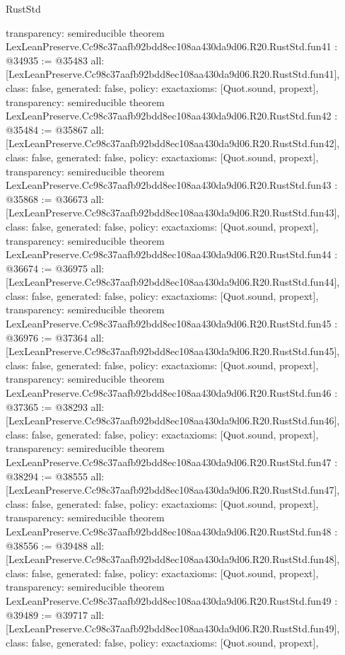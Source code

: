 \begin{lexlean}{RustStd}
\begin{coremodule}
{  transparency: semireducible
}
theorem LexLeanPreserve.Cc98c37aafb92bdd8ec108aa430da9d06.R20.RustStd.fun41 : @34935 := @35483 {
  all: [LexLeanPreserve.Cc98c37aafb92bdd8ec108aa430da9d06.R20.RustStd.fun41],
  class: false,
  generated: false,
  policy: exact{axioms: [Quot.sound, propext]},
  transparency: semireducible
}
theorem LexLeanPreserve.Cc98c37aafb92bdd8ec108aa430da9d06.R20.RustStd.fun42 : @35484 := @35867 {
  all: [LexLeanPreserve.Cc98c37aafb92bdd8ec108aa430da9d06.R20.RustStd.fun42],
  class: false,
  generated: false,
  policy: exact{axioms: [Quot.sound, propext]},
  transparency: semireducible
}
theorem LexLeanPreserve.Cc98c37aafb92bdd8ec108aa430da9d06.R20.RustStd.fun43 : @35868 := @36673 {
  all: [LexLeanPreserve.Cc98c37aafb92bdd8ec108aa430da9d06.R20.RustStd.fun43],
  class: false,
  generated: false,
  policy: exact{axioms: [Quot.sound, propext]},
  transparency: semireducible
}
theorem LexLeanPreserve.Cc98c37aafb92bdd8ec108aa430da9d06.R20.RustStd.fun44 : @36674 := @36975 {
  all: [LexLeanPreserve.Cc98c37aafb92bdd8ec108aa430da9d06.R20.RustStd.fun44],
  class: false,
  generated: false,
  policy: exact{axioms: [Quot.sound, propext]},
  transparency: semireducible
}
theorem LexLeanPreserve.Cc98c37aafb92bdd8ec108aa430da9d06.R20.RustStd.fun45 : @36976 := @37364 {
  all: [LexLeanPreserve.Cc98c37aafb92bdd8ec108aa430da9d06.R20.RustStd.fun45],
  class: false,
  generated: false,
  policy: exact{axioms: [Quot.sound, propext]},
  transparency: semireducible
}
theorem LexLeanPreserve.Cc98c37aafb92bdd8ec108aa430da9d06.R20.RustStd.fun46 : @37365 := @38293 {
  all: [LexLeanPreserve.Cc98c37aafb92bdd8ec108aa430da9d06.R20.RustStd.fun46],
  class: false,
  generated: false,
  policy: exact{axioms: [Quot.sound, propext]},
  transparency: semireducible
}
theorem LexLeanPreserve.Cc98c37aafb92bdd8ec108aa430da9d06.R20.RustStd.fun47 : @38294 := @38555 {
  all: [LexLeanPreserve.Cc98c37aafb92bdd8ec108aa430da9d06.R20.RustStd.fun47],
  class: false,
  generated: false,
  policy: exact{axioms: [Quot.sound, propext]},
  transparency: semireducible
}
theorem LexLeanPreserve.Cc98c37aafb92bdd8ec108aa430da9d06.R20.RustStd.fun48 : @38556 := @39488 {
  all: [LexLeanPreserve.Cc98c37aafb92bdd8ec108aa430da9d06.R20.RustStd.fun48],
  class: false,
  generated: false,
  policy: exact{axioms: [Quot.sound, propext]},
  transparency: semireducible
}
theorem LexLeanPreserve.Cc98c37aafb92bdd8ec108aa430da9d06.R20.RustStd.fun49 : @39489 := @39717 {
  all: [LexLeanPreserve.Cc98c37aafb92bdd8ec108aa430da9d06.R20.RustStd.fun49],
  class: false,
  generated: false,
  policy: exact{axioms: [Quot.sound, propext]},
}
\end{coremodule}
\end{lexlean}
